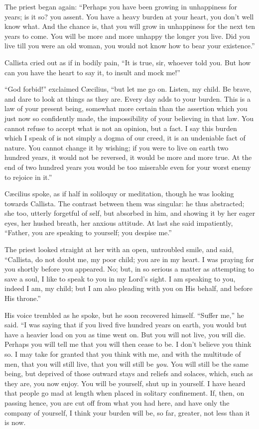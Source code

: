 The priest began again: ``Perhaps you have been growing in
unhappiness for years; is it so? you assent. You have a heavy burden
at your heart, you don't well know what. And the chance is, that you
will grow in unhappiness for the next ten years to come. You will be
more and more unhappy the longer you live. Did you live till you were
an old woman, you would not know how to bear your existence.''

Callista cried out as if in bodily pain, ``It is true, sir,
whoever told you. But how can you have the heart to say it, to insult
and mock me!''

``God forbid!'' exclaimed Cæcilius, ``but let me go
on. Listen, my child. Be brave, and dare to look at things as
they are. Every day adds to your burden. This is a law of your present
being, somewhat more certain than the assertion which you just now so
confidently made, the impossibility of your believing in that law. You
cannot refuse to accept what is not an opinion, but a fact. I say this
burden which I speak of is not simply a dogma of our creed, it is an
undeniable fact of nature. You cannot change it by wishing; if you
were to live on earth two hundred years, it would not be reversed, it
would be more and more true. At the end of two hundred years you would
be too miserable even for your worst enemy to rejoice in it.''

Cæcilius spoke, as if half in soliloquy or meditation, though he
was looking towards Callista. The contrast between them was singular:
he thus abstracted; she too, utterly forgetful of self, but absorbed
in him, and showing it by her eager eyes, her hushed breath, her
anxious attitude. At last she said impatiently, ``Father, you are
speaking to yourself; you despise me.''

The priest looked straight at her with an open, untroubled smile,
and said, ``Callista, do not doubt me, my poor child; you are in
my heart. I was praying for you shortly before you appeared. No; but,
in so serious a matter as attempting to save a soul, I like to speak
to you in my Lord's sight. I am speaking to you, indeed I am, my
child; but I am also pleading with you on His behalf, and before His
throne.''

His voice trembled as he spoke, but he soon recovered himself.
``Suffer me,'' he said. ``I was saying that if you lived
five hundred years on earth, you would but have a heavier load on you
as time went on. But you will not live, you will die. Perhaps you will
tell me that you will then cease to be. I don't believe you think so.
I may take for granted that you think with me, and with the multitude
of men, that you will still live, that you will still be \emph{you}.
You will still be the same being, but deprived of those outward stays
and reliefs and solaces, which, such as they are, you now enjoy. You
will be yourself, shut up in yourself. I have heard that people go mad
at length when placed in solitary confinement. If, then, on passing
hence, you are cut off from what you had here, and have only the
company of yourself, I think your burden will be, so far, greater, not
less than it is now.

